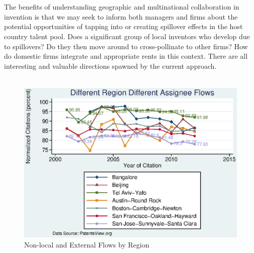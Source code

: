 \documentclass[12pt]{article}
\begin{document}
\\\\
The benefits of understanding geographic and multinational collaboration in invention is that we may seek to inform both managers and firms about the potential opportunities of tapping into or creating spillover effects in the host country talent pool. Does a significant group of local inventors who develop due to spillovers? Do they then move around to cross-pollinate to other firms? How do domestic firms integrate and appropriate rents in this context. There are all interesting and valuable directions spawned by the current approach. 
\\\\


\begin{figure}[h]
\begin{centering}
  \includegraphics[width=\textwidth]{DiffRegionDiffAssigneeFlows}
  \caption{Non-local and External Flows by Region}
  \label{fig:DiffRegionDiffAssigneeFlows}
\end{centering}
\end{figure}
\end{document}
